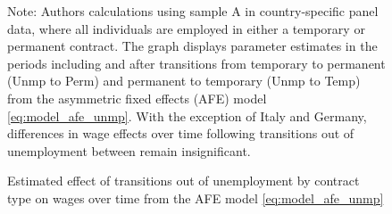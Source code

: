 \begin{figure}
    \caption{Estimated effect of transitions out of unemployment by contract type on wages over time from the AFE model \ref{eq:model_afe_unmp}}
    \label{graph_unmp_post}
    \footnotesize{Note: Authors calculations using sample A in country-specific panel data, where all individuals are employed in either a temporary or permanent contract.  The graph displays parameter estimates in the periods including and after transitions from temporary to permanent (Unmp to Perm) and permanent to temporary (Unmp to Temp) from the asymmetric fixed effects (AFE) model \ref{eq:model_afe_unmp}.  With the exception of Italy and Germany, differences in wage effects over time following transitions out of unemployment between remain insignificant.}
\end{figure}

